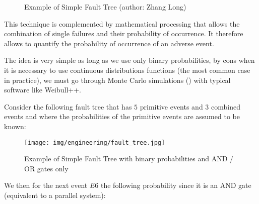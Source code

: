 \begin{figure}[H]
		\caption{Example of Simple Fault Tree (author: Zhang Long)}
	\end{figure}
	This technique is complemented by mathematical processing that allows the combination of single failures and their probability of occurrence. It therefore allows to quantify the probability of occurrence of an adverse event.
	
	The idea is very simple as long as we use only binary probabilities, by cons when it is necessary to use continuous distributions functions (the most common case in practice), we must go through Monte Carlo simulations () with typical software like Weibull++.
	
	Consider the following fault tree that has $5$ primitive events and $3$ combined events and where the probabilities of the primitive events are assumed to be known:
	\begin{figure}[H]
		\begin{center}
		\texttt{[image: img/engineering/fault\_tree.jpg]}
		\end{center}	
		\caption{Example of Simple Fault Tree with binary probabilities and AND / OR gates only}
	\end{figure}
	We then for the next event $E6$ the following probability since it is an AND gate (equivalent to a parallel system):
	

